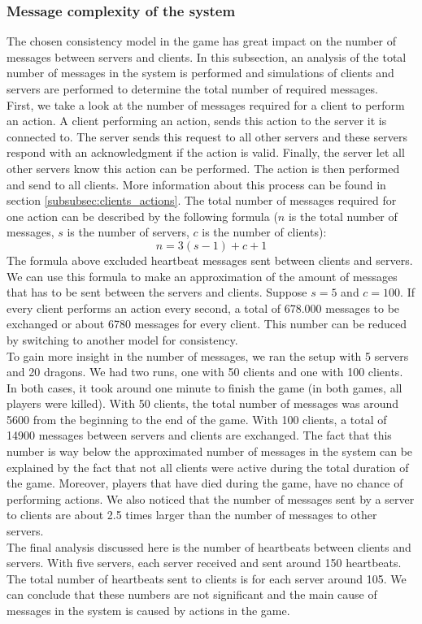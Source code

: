 	\subsubsection{Message complexity of the system}
	\label{subsubsec:nummessages}
		The chosen consistency model in the game has great impact on the number of messages between servers and clients. 
		In this subsection, an analysis of the total number of messages in the system is performed and simulations of clients and servers are performed to determine the total number of required messages.\\
		First, we take a look at the number of messages required for a client to perform an action. 
		A client performing an action, sends this action to the server it is connected to. 
		The server sends this request to all other servers and these servers respond with an acknowledgment if the action is valid. 
		Finally, the server let all other servers know this action can be performed. 
		The action is then performed and send to all clients. 
		More information about this process can be found in section \ref{subsubsec:clients_actions}. 
		The total number of messages required for one action can be described by the following formula ($ n $ is the total number of messages, $ s $ is the number of servers, $ c $ is the number of clients):
		$$ n = 3(s - 1) + c + 1 $$
		The formula above excluded heartbeat messages sent between clients and servers.
		We can use this formula to make an approximation of the amount of messages that has to be sent between the servers and clients. 
		Suppose $ s = 5 $ and $ c = 100 $. 
		If every client performs an action every second, a total of 678.000 messages to be exchanged or about 6780 messages for every client. 
		This number can be reduced by switching to another model for consistency.\\
		To gain more insight in the number of messages, we ran the setup with 5 servers and 20 dragons. 
		We had two runs, one with 50 clients and one with 100 clients. 
		In both cases, it took around one minute to finish the game (in both games, all players were killed). 
		With 50 clients, the total number of messages was around 5600 from the beginning to the end of the game. 
		With 100 clients, a total of 14900 messages between servers and clients are exchanged. 
		The fact that this number is way below the approximated number of messages in the system can be explained by the fact that not all clients were active during the total duration of the game. 
		Moreover, players that have died during the game, have no chance of performing actions. We also noticed that the number of messages sent by a server to clients are about 2.5 times larger than the number of messages to other servers.\\
		The final analysis discussed here is the number of heartbeats between clients and servers. 
		With five servers, each server received and sent around 150 heartbeats. 
		The total number of heartbeats sent to clients is for each server around 105. 
		We can conclude that these numbers are not significant and the main cause of messages in the system is caused by actions in the game.
